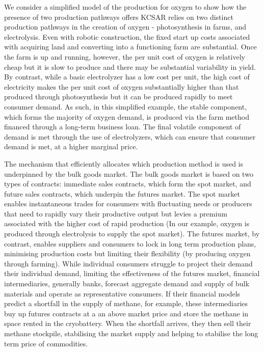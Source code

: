 \documentclass[fleqn,10pt]{Stylesheet} %
\begin{document}
We consider a simplified model of the production for oxygen to show how the presence of two production pathways offers KCSAR relies on two distinct production pathways in the creation of oxygen - photosynthesis in farms, and electrolysis. Even with robotic construction, the fixed start up costs associated with acquiring land and converting into a functioning farm are substantial. Once the farm is up and running, however, the per unit cost of oxygen is relatively cheap but it is slow to produce and there may be substantial variability in yield. By contrast, while a basic electrolyzer has a low cost per unit, the high cost of electricity makes the per unit cost of oxygen substantially higher than that produced through photosynthesis but it can be produced rapidly to meet consumer demand. As such, in this simplified example, the stable component, which forms the majority of oxygen demand, is produced via the farm method financed through a long-term business loan. The final volatile component of demand is met through the use of  electrolyzers, which can ensure that consumer demand is met, at a higher marginal price.

The mechanism that efficiently allocates which production method is used is underpinned by the bulk goods market. The bulk goods market is based on two types of contracts: immediate sales contracts, which form the spot market, and future sales contracts, which underpin the futures market. The spot market enables instantaneous trades for consumers with fluctuating needs or producers that need to rapidly vary their productive output but levies a premium associated with the higher cost of rapid production (In our example, oxygen is produced through electrolysis to supply the spot market). The futures market, by contrast, enables suppliers and consumers to lock in long term production plans, minimising production costs but limiting their flexibility (by producing oxygen through farming). While individual consumers struggle to project their demand their individual demand, limiting the effectiveness of the futures market, financial intermediaries, generally banks, forecast aggregate demand and supply of bulk materials and operate as representative consumers. If their financial models predict a shortfall in the supply of methane, for example, these intermediaries buy up futures contracts at a an above market price and store the methane in space rented in the cryobattery. When the shortfall arrives, they then sell their methane stockpile, stabilising the market supply and helping to stabilise the long term price of commodities. 
\end{document}
